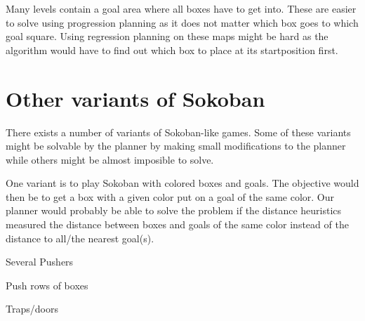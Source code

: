 Many levels contain a goal area where all boxes have to get into. These are easier to solve using progression planning as it does not matter which box goes to which goal square. Using regression planning on these maps might be hard as the algorithm would have to find out which box to place at its startposition first.

\section{Other variants of Sokoban}
There exists a number of variants of Sokoban-like games. Some of these variants might be solvable by the planner by making small modifications to the planner while others might be almost imposible to solve.

\begin{description}
\item[Colored boxes] One variant is to play Sokoban with colored boxes and goals. The objective would then be to get a box with a given color put on a goal of the same color. Our planner would probably be able to solve the problem if the distance heuristics measured the distance between boxes and goals of the same color instead of the distance to all/the nearest goal(s).
\item Several Pushers
\item Push rows of boxes
\item Traps/doors
\end{description}
